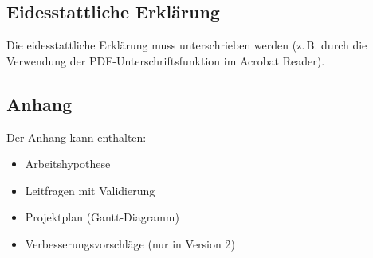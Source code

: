 \subsection*{Eidesstattliche Erklärung}
\label{subsec:erklaerung_struktur}

Die eidesstattliche Erklärung muss unterschrieben werden (z.\,B. durch die Verwendung der PDF-Unterschriftsfunktion im Acrobat Reader).

\subsection*{Anhang}
\label{subsec:anhang_struktur}

Der Anhang kann enthalten:
\begin{itemize}
	\item Arbeitshypothese
	\item Leitfragen mit Validierung
	\item Projektplan (Gantt-Diagramm)
	\item Verbesserungsvorschläge (nur in Version 2)
\end{itemize}

